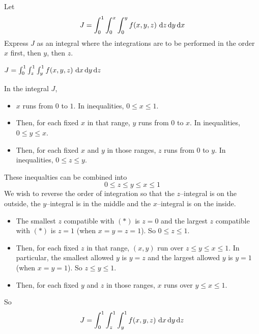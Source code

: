 \begin{question}[M200 2014A] %
Let
\begin{equation*}
J=\int_0^1 \int_0^x\int_0^y f(x,y,z)\ \mathrm{d}z\,\mathrm{d}y\,\mathrm{d}x
\end{equation*}
Express $J$ as an integral where the integrations are to be performed 
in the order $x$ first, then $y$, then $z$.
\end{question}

%

\begin{answer}
$J = \int_0^1 \int_z^1\int_y^1 f(x,y,z)\ \dee{x}\,\dee{y}\,\dee{z}$
\end{answer}

\begin{solution}
In the integral $J$,
\begin{itemize}
\item
$x$ runs from $0$ to $1$. 
In inequalities, $0\le x\le 1$.
\item
Then, for each fixed $x$ in that range, $y$ runs from $0$ to $x$.
In inequalities, $0\le y\le x$.
\item
Then, for each fixed $x$ and $y$ in those ranges, $z$ runs from $0$ to $y$.
In inequalities, $0\le z\le y$.

\end{itemize}
These inequalties can be combined into 
\begin{equation*}
0\le z\le y\le x\le 1 \tag{$*$}
\end{equation*}
We wish to reverse the order of integration so that the $z$--integral
is on the outside, the $y$--integral is in the middle and the $x$--integral
is on the inside.
\begin{itemize}
\item
The smallest $z$ compatible with $(*)$ is $z=0$
and the largest $z$ compatible with $(*)$ is $z=1$ (when $x=y=z=1$).
So $0\le z\le 1$.
\item
Then, for each fixed $z$ in that range, $(x,y)$ run over 
$z\le y\le x\le 1$. In particular, the smallest allowed $y$ is $y=z$
and the largest allowed $y$ is $y=1$ (when $x=y=1$).
So $z\le y\le 1$.
\item
Then, for each fixed $y$ and $z$ in those ranges, $x$ runs over 
$y\le x\le 1$.
\end{itemize}
So 
\begin{equation*}
J = \int_0^1 \int_z^1\int_y^1 f(x,y,z)\ \mathrm{d}x\,\mathrm{d}y\,\mathrm{d}z
\end{equation*}
\end{solution}


